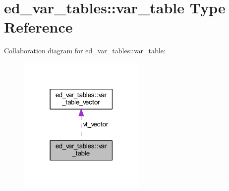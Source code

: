 \hypertarget{structed__var__tables_1_1var__table}{}\section{ed\+\_\+var\+\_\+tables\+:\+:var\+\_\+table Type Reference}
\label{structed__var__tables_1_1var__table}


Collaboration diagram for ed\+\_\+var\+\_\+tables\+:\+:var\+\_\+table\+:\nopagebreak
\begin{figure}[H]
\begin{center}
\leavevmode
\includegraphics[width=174pt]{structed__var__tables_1_1var__table__coll__graph}
\end{center}
\end{figure}
